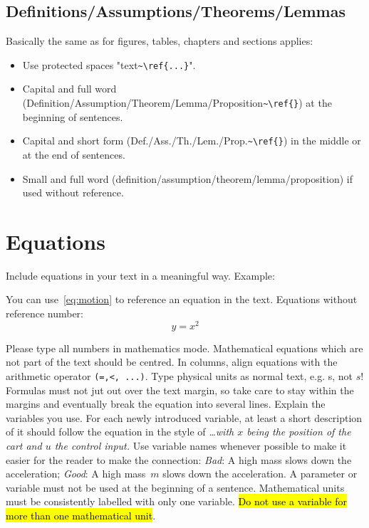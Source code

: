 \subsection{Definitions/Assumptions/Theorems/Lemmas}

Basically the same as for figures, tables, chapters and sections applies:
\begin{itemize}
	\item Use protected spaces "text\verb|~\ref{...}|".
	\item Capital and full word (Definition/Assumption/Theorem/Lemma/Proposition\verb|~\ref{}|) at the beginning of sentences.
	\item Capital and short form (Def./Ass./Th./Lem./Prop.\verb|~\ref{}|) in the middle or at the end of sentences.
	\item Small and full word (definition/assumption/theorem/lemma/proposition) if used without reference.
\end{itemize}

\section{Equations}
Include equations in your text in a meaningful way. Example: 

\vspace{\baselineskip}

\vspace{\baselineskip}

You can use~\eqref{eq:motion} to reference an equation in the
text. Equations without reference number:
\[
y=x^2
\]



Please type all numbers in mathematics mode.
Mathematical equations which are not part of the text should be centred. In columns, align equations with the arithmetic operator \verb|(=,<, ...)|.
Type physical units as normal text, e.g. s, not $s$!
Formulas must not jut out over the text margin, so take care to stay within the margins and eventually break the equation into several lines.
Explain the variables you use. For each newly introduced variable, at least a short description of it should follow the equation in the style of \emph{\ldots with $x$ being the position of the cart and $u$ the control input.} Use variable names whenever possible to make it easier for the reader to make the connection: \emph{Bad}: A high mass slows down the acceleration; \emph{Good}: A high mass~$m$ slows down the acceleration.
A parameter or variable must not be used at the beginning of a sentence.
Mathematical units must be consistently labelled with only one variable. \hl{Do not
use a variable for more than one mathematical unit}.

